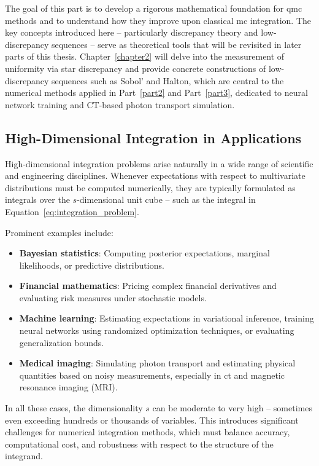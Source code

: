The goal of this part is to develop a rigorous mathematical foundation for
\ac{qmc} methods and to understand how they improve upon classical \ac{mc}
integration. The key concepts introduced here -- particularly discrepancy theory
and low-discrepancy sequences -- serve as theoretical tools that will be
revisited in later parts of this thesis. Chapter~\ref{chapter2} will delve into
the measurement of uniformity via star discrepancy and provide concrete
constructions of low-discrepancy sequences such as Sobol' and Halton, which are
central to the numerical methods applied in Part~\ref{part2} and
Part~\ref{part3}, dedicated to neural network training and CT-based photon
transport simulation.


\subsection{High-Dimensional Integration in Applications}
High-dimensional integration problems arise naturally in a wide range of
scientific and engineering disciplines. Whenever expectations with respect to
multivariate distributions must be computed numerically, they are typically
formulated as integrals over the $s$-dimensional unit cube -- such as the
integral in Equation~\eqref{eq:integration_problem}.

Prominent examples include:
\begin{itemize}
    \item \textbf{Bayesian statistics}: Computing posterior expectations, marginal likelihoods, or predictive distributions.
    \item \textbf{Financial mathematics}: Pricing complex financial derivatives and evaluating risk measures under stochastic models.
    \item \textbf{Machine learning}: Estimating expectations in variational inference, training neural networks using randomized optimization techniques, or evaluating generalization bounds.
    \item \textbf{Medical imaging}: Simulating photon transport and estimating physical quantities based on noisy measurements, especially in \ac{ct} and magnetic resonance imaging (MRI).
\end{itemize}

In all these cases, the dimensionality $s$ can be moderate to very high --
sometimes even exceeding hundreds or thousands of variables. This introduces
significant challenges for numerical integration methods, which must balance
accuracy, computational cost, and robustness with respect to the structure of
the integrand.

